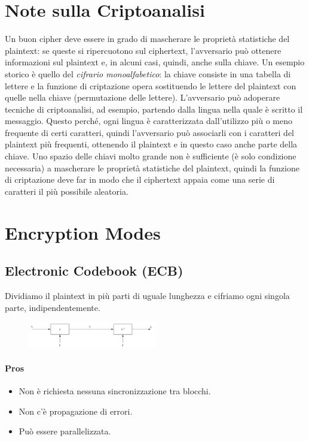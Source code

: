 \documentclass[a4paper,12pt]{article}
\begin{document}
\section{Note sulla Criptoanalisi}
Un buon cipher deve essere in grado di mascherare le proprietà statistiche del plaintext: se queste si ripercuotono sul ciphertext, l'avversario può ottenere informazioni sul plaintext e, in alcuni casi, quindi, anche sulla chiave.
Un esempio storico è quello del \textit{cifrario monoalfabetico}: la chiave consiste in una tabella di lettere e la funzione di criptazione opera sostituendo le lettere del plaintext con quelle nella chiave (permutazione delle lettere). 
L'avversario può adoperare tecniche di criptoanalisi, ad esempio, partendo dalla lingua nella quale è scritto il messaggio. 
Questo perché, ogni lingua è caratterizzata dall'utilizzo più o meno frequente di certi caratteri, quindi l'avversario può associarli con i caratteri del plaintext più frequenti, ottenendo il plaintext e in questo caso anche parte della chiave.
Uno spazio delle chiavi molto grande non è sufficiente (è solo condizione necessaria) a mascherare le proprietà statistiche del plaintext, quindi la funzione di criptazione deve far in modo che il ciphertext appaia come una serie di caratteri il più possibile aleatoria.

\section{Encryption Modes}
\subsection{Electronic Codebook (ECB)}
Dividiamo il plaintext in più parti di uguale lunghezza e cifriamo ogni singola parte, indipendentemente.
\begin{figure}[H]
  \centering
  \includegraphics[width=0.5\textwidth]{img/ecb}
\end{figure}
\paragraph{Pros}
\begin{itemize}
	\item Non è richiesta nessuna sincronizzazione tra blocchi.
	\item Non c'è propagazione di errori.
	\item Può essere parallelizzata.
\end{itemize}
\end{document}
